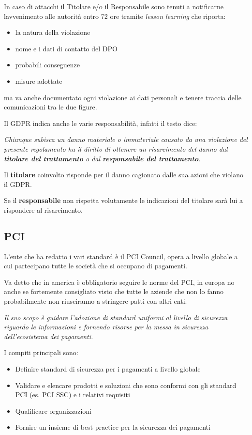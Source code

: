 In caso di attacchi il Titolare e/o il Responsabile sono tenuti a
notificarne l\textquotesingle avvenimento alle autorità entro 72 ore
tramite \emph{lesson learning} che riporta:

\begin{itemize}
\item
  la natura della violazione
\item
  nome e i dati di contatto del DPO
\item
  probabili conseguenze
\item
  misure adottate
\end{itemize}

ma va anche documentato ogni violazione ai dati personali e tenere
traccia delle comunicazioni tra le due figure.

Il GDPR indica anche le varie responsabilità, infatti il testo dice:

\emph{Chiunque subisca un danno materiale o immateriale causato da una
violazione del presente regolamento ha il diritto di ottenere un
risarcimento del danno dal \textbf{titolare del trattamento} o dal
\textbf{responsabile del trattamento}.}

Il \textbf{titolare} coinvolto risponde per il danno cagionato dalle sua
azioni che violano il GDPR.

Se il \textbf{responsabile} non rispetta volutamente le indicazioni del
titolare sarà lui a rispondere al risarcimento.

\subsection{PCI}\label{pci}

L'ente che ha redatto i vari standard è il PCI Council, opera a livello
globale a cui partecipano tutte le società che si occupano di pagamenti.

Va detto che in america è obbligatorio seguire le norme del PCI, in
europa no anche se fortemente consigliato visto che tutte le aziende che
non lo fanno probabilmente non riusciranno a stringere patti con altri
enti.

\emph{Il suo scopo è guidare l'adozione di standard uniformi al livello
di sicurezza riguardo le informazioni e fornendo risorse per la messa in
sicurezza dell'ecosistema dei pagamenti.}

I compiti principali sono:

\begin{itemize}
\item
  Definire standard di sicurezza per i pagamenti a livello globale
\item
  Validare e elencare prodotti e soluzioni che sono conformi con gli
  standard PCI (es. PCI SSC) e i relativi requisiti
\item
  Qualificare organizzazioni
\item
  Fornire un insieme di best practice per la sicurezza dei pagamenti
\end{itemize}

